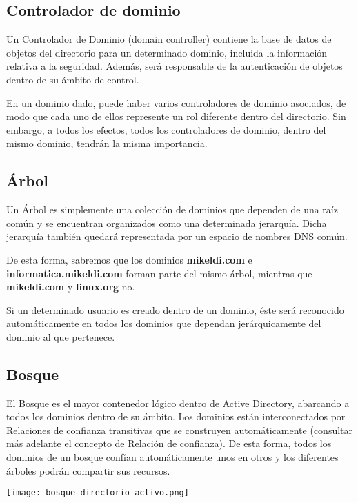 \subsection{Controlador de dominio}
Un Controlador de Dominio (domain controller) contiene la base de datos de objetos del directorio para un determinado dominio, incluida la información relativa a la seguridad. Además, será responsable de la autenticación de objetos dentro de su ámbito de control.

En un dominio dado, puede haber varios controladores de dominio asociados, de modo que cada uno de ellos represente un rol diferente dentro del directorio. Sin embargo, a todos los efectos, todos los controladores de dominio, dentro del mismo dominio, tendrán la misma importancia.


\subsection{Árbol}
Un Árbol es simplemente una colección de dominios que dependen de una raíz común y se encuentran organizados como una determinada jerarquía. Dicha jerarquía también quedará representada por un espacio de nombres DNS común.

De esta forma, sabremos que los dominios \textbf{mikeldi.com} e \textbf{informatica.mikeldi.com} forman parte del mismo árbol, mientras que \textbf{mikeldi.com} y \textbf{linux.org} no.

Si un determinado usuario es creado dentro de un dominio, éste será reconocido automáticamente en todos los dominios que dependan jerárquicamente del dominio al que pertenece.


\subsection{Bosque}
El Bosque es el mayor contenedor lógico dentro de Active Directory, abarcando a todos los dominios dentro de su ámbito. Los dominios están interconectados por Relaciones de confianza transitivas que se construyen automáticamente (consultar más adelante el concepto de Relación de confianza). De esta forma, todos los dominios de un bosque confían automáticamente unos en otros y los diferentes árboles podrán compartir sus recursos.

\begin{center}
    \vspace{-15pt}
    \texttt{[image: bosque\_directorio\_activo.png]}
    \vspace{-15pt}
\end{center}

